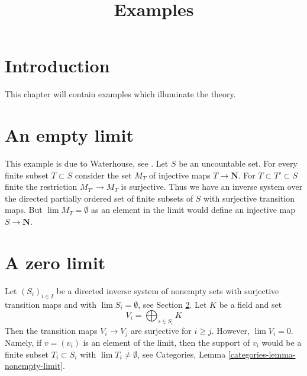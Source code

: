 

%


\title{Examples}


\maketitle

\label{section-phantom}

\tableofcontents

\section{Introduction}
\label{section-introduction}

\noindent
This chapter will contain examples which illuminate the theory.





\section{An empty limit}
\label{section-empty-limit}

\noindent
This example is due to Waterhouse, see \cite{Waterhouse}.
Let $S$ be an uncountable set. For every finite subset
$T \subset S$ consider the set $M_T$ of injective maps $T \to \mathbf{N}$.
For $T \subset T' \subset S$ finite the restriction $M_{T'} \to M_T$
is surjective. Thus we have an inverse system over the
directed partially ordered set of finite subsets of $S$
with surjective transition maps.
But $\lim M_T = \emptyset$ as an element in the limit would
define an injective map $S \to \mathbf{N}$.



\section{A zero limit}
\label{section-zero-limit}

\noindent
Let $(S_i)_{i \in I}$ be a directed inverse system of nonempty sets
with surjective transition maps and
with $\lim S_i = \emptyset$, see Section \ref{section-empty-limit}.
Let $K$ be a field and set
$$
V_i = \bigoplus\nolimits_{s \in S_i} K
$$
Then the transition maps $V_i \to V_j$ are surjective for $i \geq j$.
However, $\lim V_i = 0$. Namely, if $v = (v_i)$ is an element of the
limit, then the support of $v_i$ would be a finite subset $T_i \subset S_i$
with $\lim T_i \not = \emptyset$, see
Categories, Lemma \ref{categories-lemma-nonempty-limit}.

